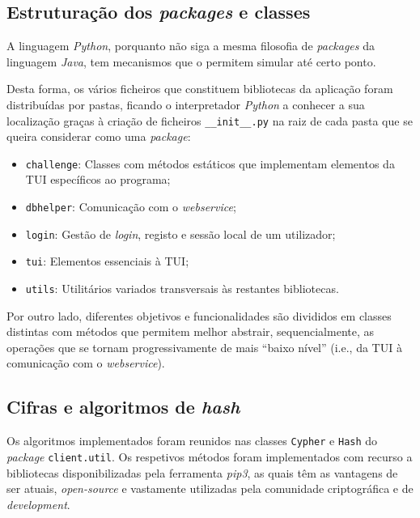 \subsection{Estruturação dos \textit{packages} e classes}
\label{ssec::implementacao:detalhes:estrutura}

A linguagem \textit{Python}, porquanto não siga a mesma filosofia de \textit{packages} da linguagem \textit{Java}, tem mecanismos que o permitem simular até certo ponto.

Desta forma, os vários ficheiros que constituem bibliotecas da aplicação foram distribuídas por pastas, ficando o interpretador \textit{Python} a conhecer a sua localização graças à criação de ficheiros \verb|__init__.py| na raiz de cada pasta que se queira considerar como uma \textit{package}:

\begin{itemize}
    \item \verb|challenge|: Classes com métodos estáticos que implementam elementos da \ac{TUI} específicos ao programa;
    \item \verb|dbhelper|: Comunicação com o \textit{webservice};
    \item \verb|login|: Gestão de \textit{login}, registo e sessão local de um utilizador;
    \item \verb|tui|: Elementos essenciais à \ac{TUI};
    \item \verb|utils|: Utilitários variados transversais às restantes bibliotecas.
\end{itemize}

Por outro lado, diferentes objetivos e funcionalidades são divididos em classes distintas com métodos que permitem melhor abstrair, sequencialmente, as operações que se tornam progressivamente de mais ``baixo nível'' (i.e., da \ac{TUI} à comunicação com o \textit{webservice}).


\subsection{Cifras e algoritmos de \textit{hash}}
\label{ssec::implementacao:detalhes:cifras}

Os algoritmos implementados foram reunidos nas classes \verb|Cypher| e \verb|Hash| do \textit{package} \verb|client.util|. Os respetivos métodos foram implementados com recurso a bibliotecas disponibilizadas pela ferramenta \textit{pip3}, as quais têm as vantagens de ser atuais, \textit{open-source} e vastamente utilizadas pela comunidade criptográfica e de \textit{development}.


